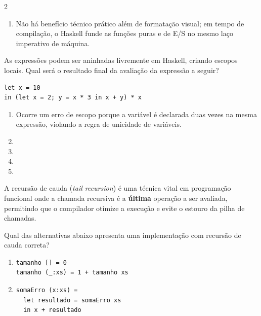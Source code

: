 \documentclass[a4paper,10pt,brazil]{article}
\begin{document}
\begin{multicols}{2}
\begin{enumerate}
  \item Não há benefício técnico prático além de formatação visual; em tempo de compilação, o Haskell funde as funções puras e de E/S no mesmo laço imperativo de máquina.


\end{enumerate}

As expressões  podem ser aninhadas livremente em Haskell, criando escopos locais. Qual será o resultado final da avaliação da expressão a seguir?
\begin{verbatim}
let x = 10 
in (let x = 2; y = x * 3 in x + y) * x
\end{verbatim}

\begin{enumerate}
  \item Ocorre um erro de escopo porque a variável  é declarada duas vezes na mesma expressão, violando a regra de unicidade de variáveis.

  \item {}

  \item {}

  \item {}

  \item {}


\end{enumerate}

A recursão de cauda (\emph{tail recursion}) é uma técnica vital em programação funcional onde a chamada recursiva é a \textbf{última} operação a ser avaliada, permitindo que o compilador otimize a execução e evite o estouro da pilha de chamadas. 

Qual das alternativas abaixo apresenta uma implementação com recursão de cauda correta?

\begin{enumerate}
  \item \begin{verbatim}
tamanho [] = 0
tamanho (_:xs) = 1 + tamanho xs
\end{verbatim}

  \item \begin{verbatim}
somaErro (x:xs) = 
  let resultado = somaErro xs 
  in x + resultado
\end{verbatim}


\end{enumerate}
\end{multicols}
\end{document}
